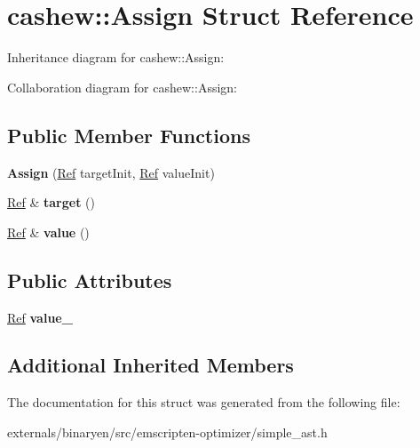\hypertarget{structcashew_1_1_assign}{}\section{cashew\+:\+:Assign Struct Reference}
\label{structcashew_1_1_assign}


Inheritance diagram for cashew\+:\+:Assign\+:


Collaboration diagram for cashew\+:\+:Assign\+:
\subsection*{Public Member Functions}
\begin{DoxyCompactItemize}
\item 
\mbox{\label{structcashew_1_1_assign_a8024e2cd33fe28e2568c999b1f48327e}} 
{\bfseries Assign} (\mbox{\hyperlink{structcashew_1_1_ref}{Ref}} target\+Init, \mbox{\hyperlink{structcashew_1_1_ref}{Ref}} value\+Init)
\item 
\mbox{\label{structcashew_1_1_assign_ac1d64e41f2b35dea3d516eee67025daf}} 
\mbox{\hyperlink{structcashew_1_1_ref}{Ref}} \& {\bfseries target} ()
\item 
\mbox{\label{structcashew_1_1_assign_a5c62469fac88b262a71704dd4f29a35d}} 
\mbox{\hyperlink{structcashew_1_1_ref}{Ref}} \& {\bfseries value} ()
\end{DoxyCompactItemize}
\subsection*{Public Attributes}
\begin{DoxyCompactItemize}
\item 
\mbox{\label{structcashew_1_1_assign_a9081d73c188d921b8d24fe1c8e9e6949}} 
\mbox{\hyperlink{structcashew_1_1_ref}{Ref}} {\bfseries value\+\_\+}
\end{DoxyCompactItemize}
\subsection*{Additional Inherited Members}


The documentation for this struct was generated from the following file\+:\begin{DoxyCompactItemize}
\item 
externals/binaryen/src/emscripten-\/optimizer/simple\+\_\+ast.\+h\end{DoxyCompactItemize}
